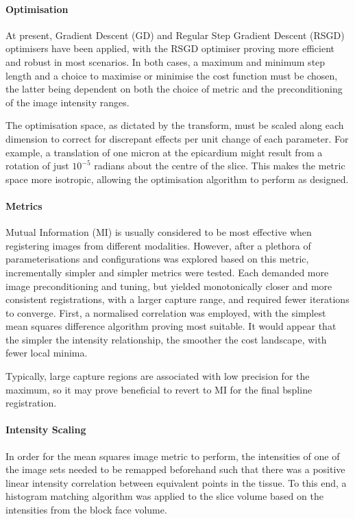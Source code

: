       \paragraph{Optimisation}
      At present, Gradient Descent (GD) and Regular Step Gradient Descent (RSGD) optimisers have been applied, with the RSGD optimiser proving more efficient and robust in most scenarios. In both cases, a maximum and minimum step length and a choice to maximise or minimise the cost function must be chosen, the latter being dependent on both the choice of metric and the preconditioning of the image intensity ranges.

      The optimisation space, as dictated by the transform, must be scaled along each dimension to correct for discrepant effects per unit change of each parameter. For example, a translation of one micron at the epicardium might result from a rotation of just $10^{-5}$ radians about the centre of the slice. This makes the metric space more isotropic, allowing the optimisation algorithm to perform as designed.

      \paragraph{Metrics}
        Mutual Information (MI) is usually considered to be most effective when registering images from different modalities. However, after a plethora of parameterisations and configurations was explored based on this metric, incrementally simpler and simpler metrics were tested. Each demanded more image preconditioning and tuning, but yielded monotonically closer and more consistent registrations, with a larger capture range, and required fewer iterations to converge. First, a normalised correlation was employed, with the simplest mean squares difference algorithm proving most suitable. It would appear that the simpler the intensity relationship, the smoother the cost landscape, with fewer local minima.

        Typically, large capture regions are associated with low precision for the maximum, so it may prove beneficial to revert to MI for the final bspline registration.

      \paragraph{Intensity Scaling}
        In order for the mean squares image metric to perform, the intensities of one of the image sets needed to be remapped beforehand such that there was a positive linear intensity correlation between equivalent points in the tissue. To this end, a histogram matching algorithm was applied to the slice volume based on the intensities from the block face volume.
        
